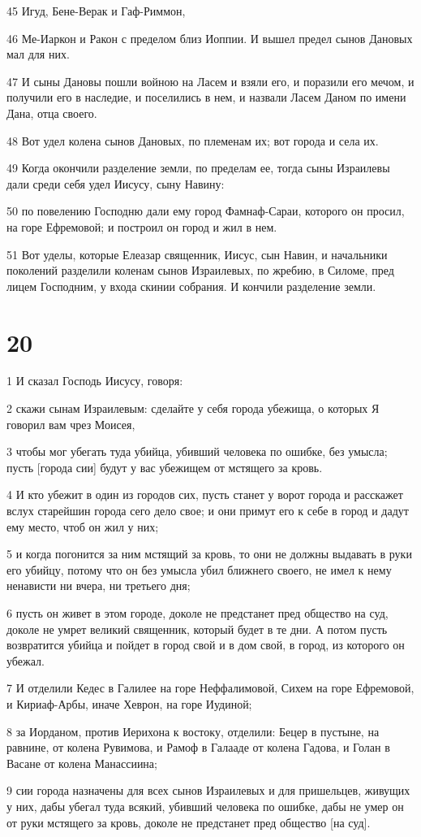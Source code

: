 \par 45 Игуд, Бене-Верак и Гаф-Риммон,
\par 46 Ме-Иаркон и Ракон с пределом близ Иоппии. И вышел предел сынов Дановых мал для них.
\par 47 И сыны Дановы пошли войною на Ласем и взяли его, и поразили его мечом, и получили его в наследие, и поселились в нем, и назвали Ласем Даном по имени Дана, отца своего.
\par 48 Вот удел колена сынов Дановых, по племенам их; вот города и села их.
\par 49 Когда окончили разделение земли, по пределам ее, тогда сыны Израилевы дали среди себя удел Иисусу, сыну Навину:
\par 50 по повелению Господню дали ему город Фамнаф-Сараи, которого он просил, на горе Ефремовой; и построил он город и жил в нем.
\par 51 Вот уделы, которые Елеазар священник, Иисус, сын Навин, и начальники поколений разделили коленам сынов Израилевых, по жребию, в Силоме, пред лицем Господним, у входа скинии собрания. И кончили разделение земли.

\chapter{20}

\par 1 И сказал Господь Иисусу, говоря:
\par 2 скажи сынам Израилевым: сделайте у себя города убежища, о которых Я говорил вам чрез Моисея,
\par 3 чтобы мог убегать туда убийца, убивший человека по ошибке, без умысла; пусть [города сии] будут у вас убежищем от мстящего за кровь.
\par 4 И кто убежит в один из городов сих, пусть станет у ворот города и расскажет вслух старейшин города сего дело свое; и они примут его к себе в город и дадут ему место, чтоб он жил у них;
\par 5 и когда погонится за ним мстящий за кровь, то они не должны выдавать в руки его убийцу, потому что он без умысла убил ближнего своего, не имел к нему ненависти ни вчера, ни третьего дня;
\par 6 пусть он живет в этом городе, доколе не предстанет пред общество на суд, доколе не умрет великий священник, который будет в те дни. А потом пусть возвратится убийца и пойдет в город свой и в дом свой, в город, из которого он убежал.
\par 7 И отделили Кедес в Галилее на горе Неффалимовой, Сихем на горе Ефремовой, и Кириаф-Арбы, иначе Хеврон, на горе Иудиной;
\par 8 за Иорданом, против Иерихона к востоку, отделили: Бецер в пустыне, на равнине, от колена Рувимова, и Рамоф в Галааде от колена Гадова, и Голан в Васане от колена Манассиина;
\par 9 сии города назначены для всех сынов Израилевых и для пришельцев, живущих у них, дабы убегал туда всякий, убивший человека по ошибке, дабы не умер он от руки мстящего за кровь, доколе не предстанет пред общество [на суд].

